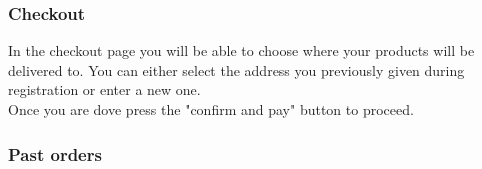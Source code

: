 	\subsubsection{Checkout}
	In the checkout page you will be able to choose where your products will be 
	delivered to. You can either select the address you previously given during
	registration or enter a new one.\\
	Once you are dove press the "confirm and pay" button to proceed.
	\subsubsection{Past orders}
	